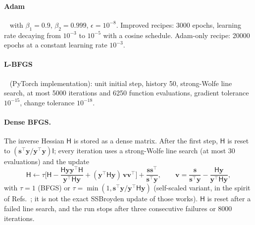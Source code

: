 \documentclass[aps,pra,onecolumn,superscriptaddress,11pt,longbibliography,floatfix,nofootinbib]{revtex4-2}
\begin{document}
\begin{table}[h]
  \caption{Training recipes (generated from \texttt{src/protocolo.py}).}
  \label{tab:hyper}
  
\end{table}

\paragraph{Adam}~\cite{kingma2015adam} with $\beta_1=0.9$, $\beta_2=0.999$, $\epsilon=10^{-8}$. Improved
recipes: 3000 epochs, learning rate decaying from $10^{-3}$ to $10^{-5}$ with a cosine schedule.
Adam-only recipe: 20000 epochs at a constant learning rate $10^{-3}$.

\paragraph{L-BFGS}~\cite{liu1989lbfgs} (PyTorch implementation): unit initial step, history 50,
strong-Wolfe line search, at most 5000 iterations and 6250 function evaluations, gradient tolerance
$10^{-15}$, change tolerance $10^{-18}$.

\paragraph{Dense BFGS.} The inverse Hessian $\mathsf H$ is stored as a dense matrix. After the first
step, $\mathsf H$ is reset to $(\bm s^{\top}\bm y/\bm y^{\top}\bm y)\mathsf I$; every iteration uses a
strong-Wolfe line search (at most 30 evaluations) and the update
\begin{equation}
  \mathsf H\leftarrow\tau\Big[\mathsf H-\frac{\mathsf H\bm y\bm y^{\top}\mathsf H}{\bm y^{\top}\mathsf H\bm y}
  +(\bm y^{\top}\mathsf H\bm y)\,\bm v\bm v^{\top}\Big]+\frac{\bm s\bm s^{\top}}{\bm s^{\top}\bm y},\qquad
  \bm v=\frac{\bm s}{\bm s^{\top}\bm y}-\frac{\mathsf H\bm y}{\bm y^{\top}\mathsf H\bm y},
\end{equation}
with $\tau=1$ (BFGS) or $\tau=\min(1,\bm s^{\top}\bm y/\bm y^{\top}\mathsf H\bm y)$ (self-scaled variant,
in the spirit of Refs.~\cite{urban2025unveiling,kiyani2025optimizer}; it is not the exact SSBroyden
update of those works). $\mathsf H$ is reset after a failed line search, and the run stops after three
consecutive failures or 8000 iterations.
\end{document}
